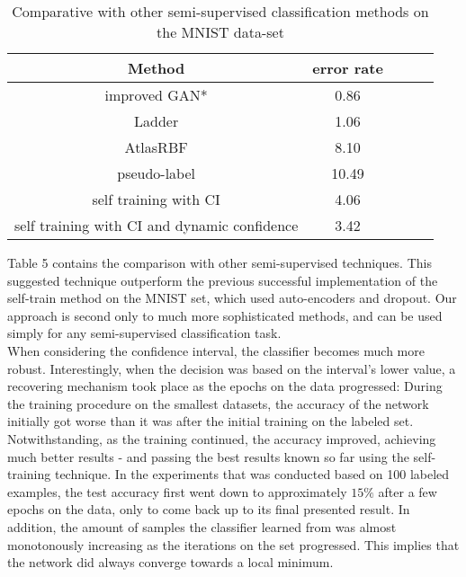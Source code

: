 \documentclass[conference, letterpaper]{IEEEtran}
\begin{document}
 \begin{table}
 \begin{center}
\begin{tabular}{|c|c|c|c|c|}\hline
Method & error rate \\ \hline\hline
improved GAN*  & 0.86 \cite{salimans2016improved} \\
Ladder  & 1.06 \cite{NIPS2015_5947} \\
AtlasRBF & 8.10 \cite{pitelis2014semi} \\
pseudo-label & 10.49 \cite{lee2013pseudo}\\
self training with CI  & 4.06  \\
self training with CI and dynamic confidence & 3.42\\\hline 
\end{tabular}
\end{center}
\caption{Comparative with other semi-supervised classification methods on the MNIST data-set}
\label{table:5}
\end{table}
Table 5 contains the comparison with other semi-supervised techniques. This suggested technique outperform the previous successful implementation of the self-train method on the MNIST set, which used auto-encoders and dropout. Our approach is second only to much more sophisticated methods, and can be used simply for any semi-supervised classification task.\\
When considering the confidence interval, the classifier becomes much more robust. Interestingly, when the decision was based on the interval's lower value, a recovering mechanism took place as the epochs on the data progressed: During the training procedure on the smallest datasets, the accuracy of the network initially got worse than it was after the initial training on the labeled set. Notwithstanding, as the training continued, the accuracy improved, achieving much better results - and passing the best results known so far using the self-training technique. In the experiments that was conducted based on 100 labeled examples, the test accuracy first went down to approximately $15\%$ after a few epochs on the data, only to come back up to its final presented result.
In addition, the amount of samples the classifier learned from was almost monotonously increasing as the iterations on the set progressed. This implies that the network did always converge towards a local minimum.
\end{document}
